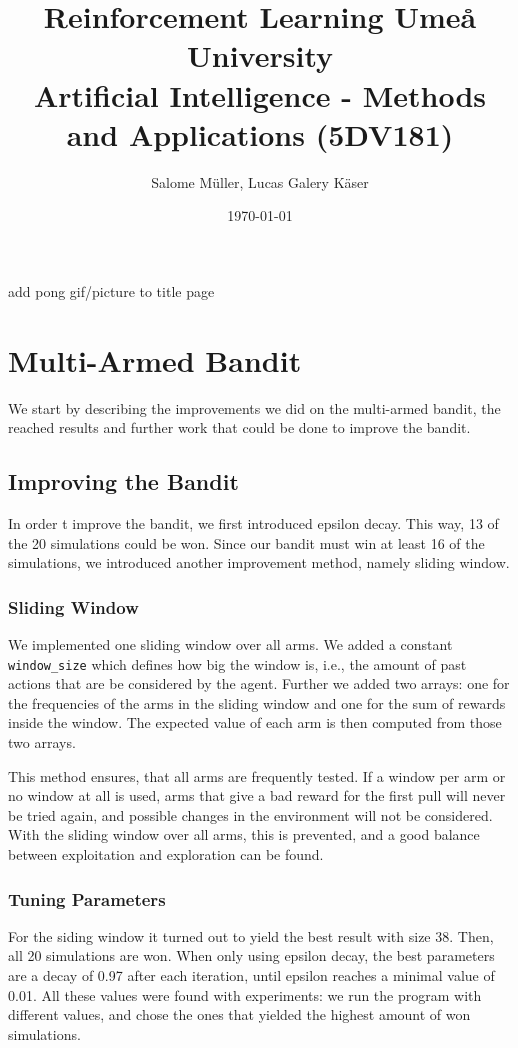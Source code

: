 \documentclass[10pt]{article}
\title{
    Reinforcement Learning
    \vspace{3em}
    {\large Umeå University \\
    Artificial Intelligence - Methods and Applications (5DV181)}
    \vspace{3em}
}
\author{Salome Müller, Lucas Galery Käser}
\date{\today}
\newcommand{\todo}[1]{{\color{red}#1}}
\begin{document}
\maketitle

\todo{add pong gif/picture to title page}

\pagebreak

\section{Multi-Armed Bandit}\label{sec:mab}
We start by describing the improvements we did on the multi-armed bandit, the reached results and further work that could be done to improve the bandit.

\subsection{Improving the Bandit}\label{subsec:improving-the-bandit}
In order t improve the bandit, we first introduced epsilon decay.
This way, 13 of the 20 simulations could be won.
Since our bandit must win at least 16 of the simulations, we introduced another improvement method, namely sliding window.

\subsubsection{Sliding Window}
We implemented one sliding window over all arms.
We added a constant \texttt{window\_size} which defines how big the window is, i.e., the amount of past actions that are be considered by the agent.
Further we added two arrays: one for the frequencies of the arms in the sliding window and one for the sum of rewards inside the window.
The expected value of each arm is then computed from those two arrays.

This method ensures, that all arms are frequently tested.
If a window per arm or no window at all is used, arms that give a bad reward for the first pull will never be tried again, and possible changes in the environment will not be considered.
With the sliding window over all arms, this is prevented, and a good balance between exploitation and exploration can be found.

\subsubsection{Tuning Parameters}
For the siding window it turned out to yield the best result with size 38.
Then, all 20 simulations are won.
When only using epsilon decay, the best parameters are a decay of 0.97 after each iteration, until epsilon reaches a minimal value of 0.01.
All these values were found with experiments: we run the program with different values, and chose the ones that yielded the highest amount of won simulations.
\end{document}
